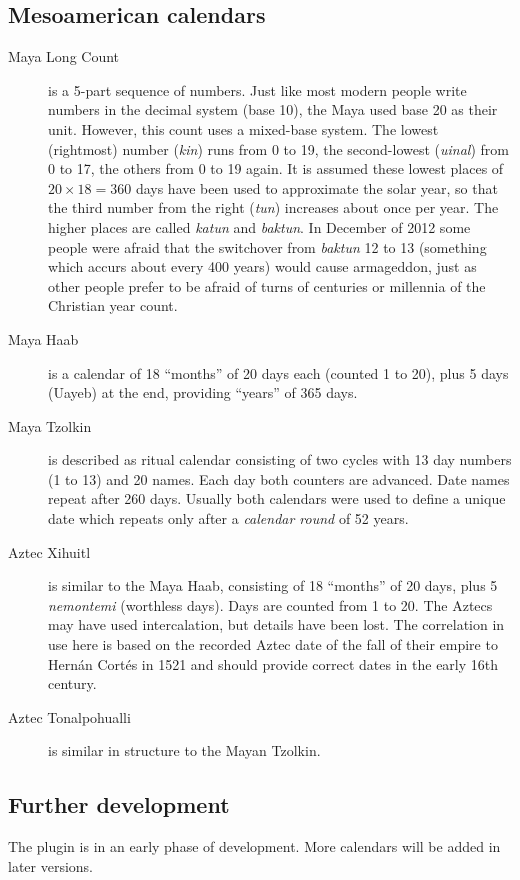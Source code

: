 \subsection{Mesoamerican calendars}
\begin{description}
\item[Maya Long Count] is a 5-part sequence of numbers. Just like most
  modern people write numbers in the decimal system (base 10), the
  Maya used base 20 as their unit. However, this count uses a
  mixed-base system. The lowest (rightmost) number (\emph{kin}) runs
  from 0 to 19, the second-lowest (\emph{uinal}) from 0 to 17, the
  others from 0 to 19 again. It is assumed these lowest places of
  $20\times18=360$ days have been used to approximate the solar year,
  so that the third number from the right (\emph{tun}) increases about
  once per year. The higher places are called \emph{katun} and
  \emph{baktun}. In December of 2012 some people were afraid that the
  switchover from \emph{baktun} 12 to 13 (something which accurs about
  every 400 years) would cause armageddon, just as other people prefer
  to be afraid of turns of centuries or millennia of the Christian
  year count.
\item[Maya Haab] is a calendar of 18 ``months'' of 20 days each
  (counted 1 to 20), plus 5 days (Uayeb) at the end, providing
  ``years'' of 365 days.
\item[Maya Tzolkin] is described as ritual calendar consisting of two
  cycles with 13 day numbers (1 to 13) and 20 names. Each day both
  counters are advanced. Date names repeat after 260 days. Usually
  both calendars were used to define a unique date which repeats only
  after a \emph{calendar round} of 52 years.
\item[Aztec Xihuitl] is similar to the Maya Haab, consisting of 18
  ``months'' of 20 days, plus 5 \emph{nemontemi} (worthless
  days). Days are counted from 1 to 20. The Aztecs may have used
  intercalation, but details have been lost. The correlation in use
  here is based on the recorded Aztec date of the fall of their empire
  to Hern\'an Cort\'es in 1521 and should provide correct dates in the
  early 16th century.
\item[Aztec Tonalpohualli] is similar in structure to the Mayan Tzolkin.
\end{description}

\subsection{Further development}
The plugin is in an early phase of development. More calendars will be added in later versions. 


